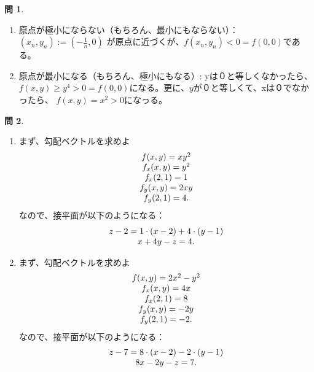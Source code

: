 \documentclass[12pt]{article} %
\theoremstyle{definition}
\newtheorem{question}{問}
\begin{document}
\begin{question}
	\begin{enumerate}[(1)]
		\item 原点が極小にならない（もちろん、最小にもならない）：
			$(x_n,y_n):=\left( -\frac{1}{n},0 \right)$ が原点に近づくが、$f(x_n,y_n)<0=f(0,0)$である。
		\item 原点が最小になる（もちろん、極小にもなる）:
			yは０と等しくなかったら、$f(x,y)\ge y^4>0=f(0,0)$になる。更に、$y$が０と等しくて、xは０でなかったら、
			$f(x,y)=x^2>0$になっる。
	\end{enumerate}
\end{question}
\begin{question}
	\begin{enumerate}[(1)]
		\item 
			まず、勾配ベクトルを求めよ
			\begin{equation*}
				\begin{array}[]{c}
					f(x,y)=xy^2\\
					f_x(x,y)=y^2\\f_x(2,1)=1\\
					f_y(x,y)=2xy\\f_y(2,1)=4.
				\end{array}
			\end{equation*}
				なので、接平面が以下のようになる：\begin{equation*}
					\begin{array}[]{c}
						z-2=1\cdot(x-2)+4\cdot(y-1)\\
						x+4y-z=4.
					\end{array}
				\end{equation*}
		\item 
			まず、勾配ベクトルを求めよ
			\begin{equation*}
				\begin{array}[]{c}
					f(x,y)=2x^2-y^2\\
					f_x(x,y)=4x\\f_x(2,1)=8\\
					f_y(x,y)=-2y\\f_y(2,1)=-2.
				\end{array}
			\end{equation*}
				なので、接平面が以下のようになる：\begin{equation*}
					\begin{array}[]{c}
						z-7=8\cdot(x-2)-2\cdot(y-1)\\
						8x-2y-z=7.
					\end{array}
				\end{equation*}
	\end{enumerate}
\end{question}
\end{document}
